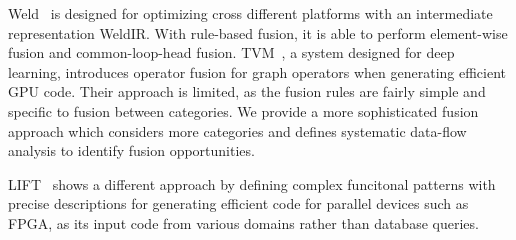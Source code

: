Weld~\cite{Palkar18:Weld} is designed for optimizing cross different platforms
with an intermediate representation WeldIR. With rule-based fusion, it is able
to perform element-wise fusion and common-loop-head fusion.
TVM~\cite{Chen18:TVM}, a system designed for deep learning, introduces
operator fusion for graph operators when generating efficient GPU code.
Their approach is limited, as the fusion rules are fairly simple and
specific to fusion between categories.
We provide a more sophisticated fusion approach which considers more categories
and defines systematic data-flow analysis to identify fusion opportunities.

LIFT~\cite{Kristien19:LiftPatterns} shows a different approach by defining
complex funcitonal patterns with precise descriptions for generating efficient
code for parallel devices such as FPGA, as its input code from various domains
rather than database queries.



